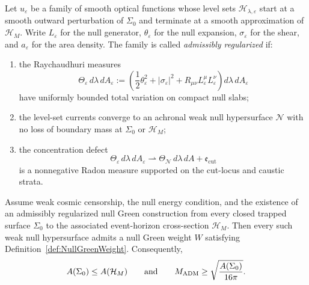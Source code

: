 \begin{definition}\label{def:RegularizedNullGreenConstruction}
Let $u_\varepsilon$ be a family of smooth optical functions whose level sets $\mathcal H_{\lambda,\varepsilon}$ start at a smooth outward perturbation of $\Sigma_0$ and terminate at a smooth approximation of $\mathcal H_M$. Write $L_\varepsilon$ for the null generator, $\theta_\varepsilon$ for the null expansion, $\sigma_\varepsilon$ for the shear, and $a_\varepsilon$ for the area density. The family is called \emph{admissibly regularized} if:
\begin{enumerate}
    \item the Raychaudhuri measures
    \[
        \Theta_\varepsilon\,d\lambda\,dA_\varepsilon
        :=
        \left(
        \frac12\theta_\varepsilon^2
        +|\sigma_\varepsilon|^2
        +R_{\mu\nu}L_\varepsilon^\mu L_\varepsilon^\nu
        \right)d\lambda\,dA_\varepsilon
    \]
    have uniformly bounded total variation on compact null slabs;
    \item the level-set currents converge to an achronal weak null hypersurface $\mathcal N$ with no loss of boundary mass at $\Sigma_0$ or $\mathcal H_M$;
    \item the concentration defect
    \[
        \Theta_\varepsilon\,d\lambda\,dA_\varepsilon
        \rightharpoonup
        \Theta_{\mathcal N}\,d\lambda\,dA+\mathfrak e_{\mathrm{cut}}
    \]
    is a nonnegative Radon measure supported on the cut-locus and caustic strata.
\end{enumerate}
\end{definition}

\begin{theorem}\label{thm:RegularizedNullGreenBreakthrough}
Assume weak cosmic censorship, the null energy condition, and the existence of an admissibly regularized null Green construction from every closed trapped surface $\Sigma_0$ to the associated event-horizon cross-section $\mathcal H_M$. Then every such weak null hypersurface admits a null Green weight $W$ satisfying Definition~\ref{def:NullGreenWeight}. Consequently,
\[
    A(\Sigma_0)\le A(\mathcal H_M)
    \qquad\text{and}\qquad
    M_{\mathrm{ADM}}\ge \sqrt{\frac{A(\Sigma_0)}{16\pi}}.
\]
\end{theorem}

